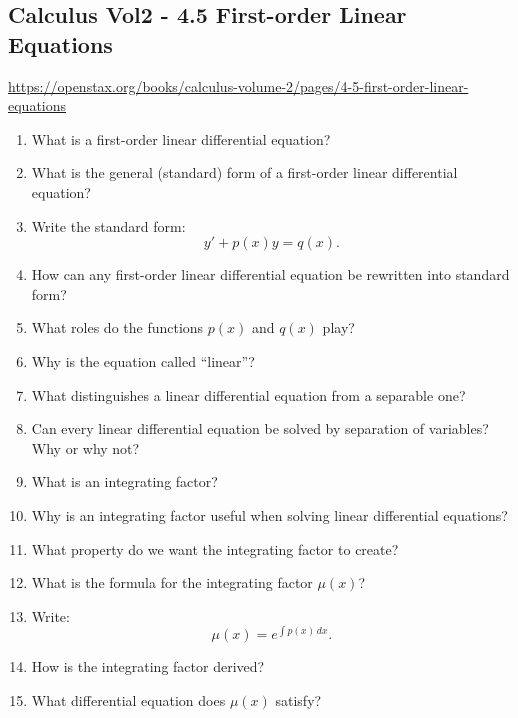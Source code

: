 \subsection{Calculus Vol2 - 4.5 First-order Linear Equations}

\url{https://openstax.org/books/calculus-volume-2/pages/4-5-first-order-linear-equations}

\begin{enumerate}

\item What is a first-order linear differential equation?

\item What is the general (standard) form of a first-order linear differential equation?

\item Write the standard form:
  \[
    y' + p(x)y = q(x).
  \]

\item How can any first-order linear differential equation be rewritten into standard form?

\item What roles do the functions $p(x)$ and $q(x)$ play?

\item Why is the equation called ``linear''?

\item What distinguishes a linear differential equation from a separable one?

\item Can every linear differential equation be solved by separation of variables? Why or why not?

\item What is an integrating factor?

\item Why is an integrating factor useful when solving linear differential equations?

\item What property do we want the integrating factor to create?

\item What is the formula for the integrating factor $\mu(x)$?

\item Write:
  \[
    \mu(x) = e^{\int p(x)\,dx}.
  \]

\item How is the integrating factor derived?

\item What differential equation does $\mu(x)$ satisfy?


\end{enumerate}
